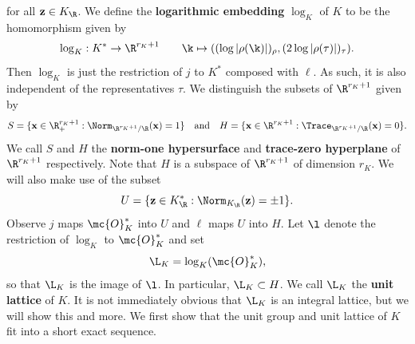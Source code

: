 \documentclass[12pt]{article}
\begin{document}
      for all \(\mathbf{z} \in K_{\R}\). We define the \textbf{logarithmic embedding} \(\log_{K}\) of \(K\) to be the homomorphism given by
      \[
        \log_{K}:K^{\ast} \to \R^{r_{K}+1} \qquad \k \mapsto ((\log|\rho(\k)|)_{\rho},(2\log|\rho(\tau)|)_{\tau}).
      \]
      Then \(\log_{K}\) is just the restriction of \(j\) to \(K^{\ast}\) composed with \(\ell\). As such, it is also independent of the representatives \(\tau\). We distinguish the subsets of \(\R^{r_{K}+1}\) given by
      \[
        S = \{\mathbf{x} \in  \R_{+}^{r_{K}+1}:\Norm_{\R^{r_{K}+1}/\R}(\mathbf{x}) = 1\} \quad \text{and} \quad H = \{\mathbf{x} \in \R^{r_{K}+1}:\Trace_{\R^{r_{K}+1}/\R}(\mathbf{x}) = 0\}.
      \]
      We call \(S\) and \(H\) the \textbf{norm-one hypersurface} and \textbf{trace-zero hyperplane} of \(\R^{r_{K}+1}\) respectively. Note that \(H\) is a subspace of \(\R^{r_{K}+1}\) of dimension \(r_{K}\). We will also make use of the subset
      \[
        U = \{\mathbf{z} \in K_{\R}^{\ast}:\Norm_{K_{\R}}(\mathbf{z}) = \pm 1\}.
      \]
      Observe \(j\) maps \(\mc{O}_{K}^{\ast}\) into \(U\) and \(\ell\) maps \(U\) into \(H\). Let \(\l\) denote the restriction of \(\log_{K}\) to \(\mc{O}_{K}^{\ast}\) and set
      \[
        \L_{K} = \log_{K}(\mc{O}_{K}^{\ast}),
      \]
      so that \(\L_{K}\) is the image of \(\l\). In particular, \(\L_{K} \subset H\). We call \(\L_{K}\) the \textbf{unit lattice} of \(K\). It is not immediately obvious that \(\L_{K}\) is an integral lattice, but we will show this and more. We first show that the unit group and unit lattice of \(K\) fit into a short exact sequence.
\end{document}
